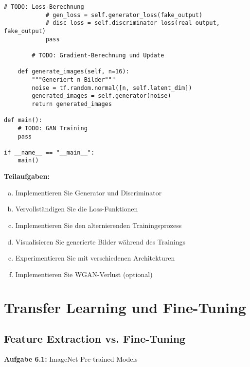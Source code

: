 \documentclass[12pt,a4paper]{article}
\begin{document}
\begin{lstlisting}[caption=GAN für MNIST]
            # TODO: Loss-Berechnung
            # gen_loss = self.generator_loss(fake_output)
            # disc_loss = self.discriminator_loss(real_output, fake_output)
            pass
        
        # TODO: Gradient-Berechnung und Update
        
    def generate_images(self, n=16):
        """Generiert n Bilder"""
        noise = tf.random.normal([n, self.latent_dim])
        generated_images = self.generator(noise)
        return generated_images

def main():
    # TODO: GAN Training
    pass

if __name__ == "__main__":
    main()
\end{lstlisting}

\textbf{Teilaufgaben:}
\begin{enumerate}[(a)]
    \item Implementieren Sie Generator und Discriminator
    \item Vervollständigen Sie die Loss-Funktionen
    \item Implementieren Sie den alternierenden Trainingsprozess
    \item Visualisieren Sie generierte Bilder während des Trainings
    \item Experimentieren Sie mit verschiedenen Architekturen
    \item Implementieren Sie WGAN-Verlust (optional)
\end{enumerate}

\section{Transfer Learning und Fine-Tuning}

\subsection{Feature Extraction vs. Fine-Tuning}

\textbf{Aufgabe 6.1:} ImageNet Pre-trained Models
\end{document}
